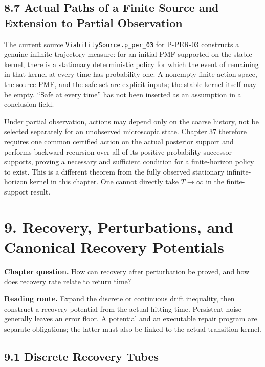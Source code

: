\documentclass[
  english,
  11pt,
  oneside]{book}
\newcounter{none} %
\begin{document}
\section{8.7 Actual Paths of a Finite Source and Extension to Partial Observation}\label{actual-paths-of-a-finite-source-and-extension-to-partial-observation}

The current source \nolinkurl{ViabilitySource.p_per_03} for P-PER-03 constructs a genuine infinite-trajectory measure: for an initial PMF supported on the stable kernel, there is a stationary deterministic policy for which the event of remaining in that kernel at every time has probability one. A nonempty finite action space, the source PMF, and the safe set are explicit inputs; the stable kernel itself may be empty. ``Safe at every time'' has not been inserted as an assumption in a conclusion field.

Under partial observation, actions may depend only on the coarse history, not be selected separately for an unobserved microscopic state. Chapter 37 therefore requires one common certified action on the actual posterior support and performs backward recursion over all of its positive-probability successor supports, proving a necessary and sufficient condition for a finite-horizon policy to exist. This is a different theorem from the fully observed stationary infinite-horizon kernel in this chapter. One cannot directly take \(T\to\infty\) in the finite-support result.

\chapter{9. Recovery, Perturbations, and Canonical Recovery Potentials}\label{ch-9}

\textbf{Chapter question.} How can recovery after perturbation be proved, and how does recovery rate relate to return time?

\textbf{Reading route.} Expand the discrete or continuous drift inequality, then construct a recovery potential from the actual hitting time. Persistent noise generally leaves an error floor. A potential and an executable repair program are separate obligations; the latter must also be linked to the actual transition kernel.

\section{9.1 Discrete Recovery Tubes}\label{discrete-recovery-tubes}
\end{document}
